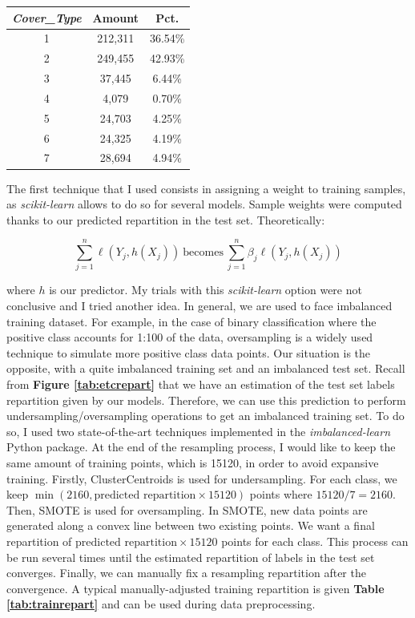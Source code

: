 \documentclass{article}
\begin{document}
\begin{multicols}{2}
\begin{center}
\captionsetup{type=tabular}
\begin{tabular}{|c|cc|}
    \hline
    \textit{Cover\_Type} & Amount & Pct. \\
    \hline
    1 & 212,311 & 36.54\% \\
    2 & 249,455 & 42.93\% \\
    3 & 37,445 & 6.44\% \\
    4 & 4,079 & 0.70\% \\
    5 & 24,703 & 4.25\% \\
    6 & 24,325 & 4.19\% \\
    7 & 28,694 & 4.94\% \\
    \hline
\end{tabular}
\label{tab:etcrepart}
\end{center}

The first technique that I used consists in assigning a weight to training samples, as
\textit{scikit-learn} allows to do so for several models. Sample weights were 
computed thanks to our predicted repartition in the test set. Theoretically:

\begin{center}
  $$
  \sum \limits_{j=1}^n \ell(Y_j, h(X_j)) \ \text{becomes} \ \sum \limits_{j=1}^n \beta_j \ell(Y_j, h(X_j))
  $$
\end{center}

where $h$ is our predictor. My trials with this \textit{scikit-learn} option 
were not conclusive and I tried another idea. In general, we are used to 
face imbalanced 
training dataset. For example,
in the case of binary classification where the positive class accounts for
1:100 of the data, oversampling is a widely used technique to simulate more
positive class data points. Our situation is the opposite, with a quite imbalanced
training set and an imbalanced test set. Recall from
\textbf{Figure \ref{tab:etcrepart}} that we have an estimation of the test
set labels repartition given by our models. Therefore, we can use this
prediction to perform undersampling/oversampling operations to get an
imbalanced training set. To do so, I used two state-of-the-art techniques
implemented in the \textit{imbalanced-learn}\cite{imblearn} Python package.
At the end of the resampling process, I would like to keep the same amount
of training points, which is 15120, in order to avoid expansive training.
Firstly, ClusterCentroids is used for undersampling. For each class, we keep
$\min (2160, \text{predicted repartition} \times 15120)$ points
where $15120/7 = 2160$.
Then, SMOTE\cite{smote} is used for oversampling. In SMOTE, new data
points are generated along
a convex line between two existing points. We want a final repartition of
$\text{predicted repartition} \times 15120$ points for each class. This process
can be run several times until the estimated repartition of labels in the test
set converges. Finally, we can manually fix a resampling repartition after
the convergence. A typical manually-adjusted training repartition is
given \textbf{Table
\ref{tab:trainrepart}} and can be used during data preprocessing.


\end{multicols}
\end{document}
